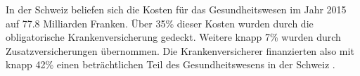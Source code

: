 \documentclass[12pt, twoside, table]{extarticle}
\begin{document}



In der Schweiz beliefen sich die Kosten für das Gesundheitswesen im Jahr 2015 auf 77.8 Milliarden Franken. Über 35\% dieser Kosten wurden durch die obligatorische Krankenversicherung gedeckt. Weitere knapp 7\% wurden durch Zusatzversicherungen übernommen. Die Krankenversicherer finanzierten also mit knapp 42\% einen beträchtlichen Teil des Gesundheitswesens in der Schweiz \cite{BundesamtfurStatistik2018Finanzierung, BundesamtfurStatistik2017KostenDaten}.
\end{document}
